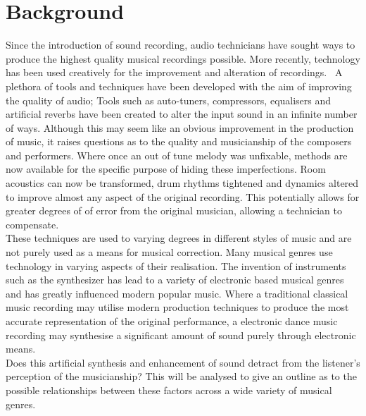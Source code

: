 \documentclass[titlepage]{scrartcl}
\begin{document}
    \section{Background}
    Since the introduction of sound recording, audio technicians have sought
    ways to produce the highest quality musical recordings possible. More
    recently, technology has been used creatively for the improvement and
    alteration of recordings.~\parencite[p.80, 258-263]{millard2005aor} A
    plethora of tools and techniques have been developed with the aim of
    improving the quality of audio; Tools such as auto-tuners, compressors,
    equalisers and artificial reverbs have been created to alter the input
    sound in an infinite number of ways.  Although this may seem like an
    obvious improvement in the production of music, it raises questions as to
    the quality and musicianship of the composers and performers. Where once an
    out of tune melody was unfixable, methods are now available for the
    specific purpose of hiding these imperfections. Room acoustics can now be
    transformed, drum rhythms tightened and dynamics altered to improve almost
    any aspect of the original recording. This potentially allows for greater
    degrees of of error from the original musician, allowing a technician to
    compensate.~\parencite{bbc2014crm}\\ 
    These techniques are used to varying degrees in different styles of music
    and are not purely used as a means for musical correction. Many musical
    genres use technology in varying aspects of their realisation.  The
    invention of instruments such as the synthesizer has lead to a variety of
    electronic based musical genres and has greatly influenced modern popular
    music. Where a traditional classical music recording may utilise modern
    production techniques to produce the most accurate representation of the
    original performance, a electronic dance music recording may synthesise a
    significant amount of sound purely through electronic means.\\
    Does this artificial synthesis and enhancement of sound detract from
    the listener's perception of the musicianship? This will be analysed to
    give an outline as to the possible relationships between these factors
    across a wide variety of musical genres.
\end{document}
